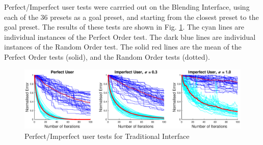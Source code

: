 \documentclass[11pt, oneside]{report}   	%
\begin{document}
Perfect/Imperfect user tests were carrried out on the Blending Interface, using each of the 36 presets as a goal preset, and starting from the closest preset to the goal preset. The results of these tests are shown in Fig. \ref{fig:TradTest1}. The cyan lines are individual instances of the Perfect Order test. The  dark blue lines are individual instances of the Random Order test. The solid red lines are the mean of the Perfect Order tests (solid), and the Random Order tests (dotted). 
\begin{figure}[h]
	\centering
	\hspace{-10pt}
	\includegraphics[trim  ={3cm, 0cm, 3cm, 0cm}, clip, width = 6.5in]{TradInterfaceTests1b.eps}
	\vspace{-5pt}
	\caption{Perfect/Imperfect user tests for Traditional Interface}
	\label{fig:TradTest1}
	\vspace{-15pt}
\end{figure}
\end{document}
